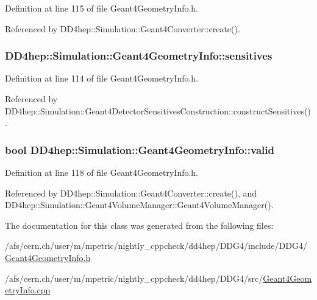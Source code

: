 Definition at line 115 of file Geant4GeometryInfo.h.

Referenced by DD4hep::Simulation::Geant4Converter::create().\hypertarget{class_d_d4hep_1_1_simulation_1_1_geant4_geometry_info_ab8c6e7272ad7cf326e06e5ea1f200418}{
\subsubsection[{sensitives}]{ {\bf DD4hep::Simulation::Geant4GeometryInfo::sensitives}}}
\label{class_d_d4hep_1_1_simulation_1_1_geant4_geometry_info_ab8c6e7272ad7cf326e06e5ea1f200418}


Definition at line 114 of file Geant4GeometryInfo.h.

Referenced by DD4hep::Simulation::Geant4DetectorSensitivesConstruction::constructSensitives().\hypertarget{class_d_d4hep_1_1_simulation_1_1_geant4_geometry_info_a0bc71f53d762f58ec47c76dc5db8b075}{
\subsubsection[{valid}]{\setlength{\rightskip}{0pt plus 5cm}bool {\bf DD4hep::Simulation::Geant4GeometryInfo::valid}}}
\label{class_d_d4hep_1_1_simulation_1_1_geant4_geometry_info_a0bc71f53d762f58ec47c76dc5db8b075}


Definition at line 118 of file Geant4GeometryInfo.h.

Referenced by DD4hep::Simulation::Geant4Converter::create(), and DD4hep::Simulation::Geant4VolumeManager::Geant4VolumeManager().

The documentation for this class was generated from the following files:\begin{DoxyCompactItemize}
\item 
/afs/cern.ch/user/m/mpetric/nightly\_\-cppcheck/dd4hep/DDG4/include/DDG4/\hyperlink{_geant4_geometry_info_8h}{Geant4GeometryInfo.h}\item 
/afs/cern.ch/user/m/mpetric/nightly\_\-cppcheck/dd4hep/DDG4/src/\hyperlink{_geant4_geometry_info_8cpp}{Geant4GeometryInfo.cpp}\end{DoxyCompactItemize}
